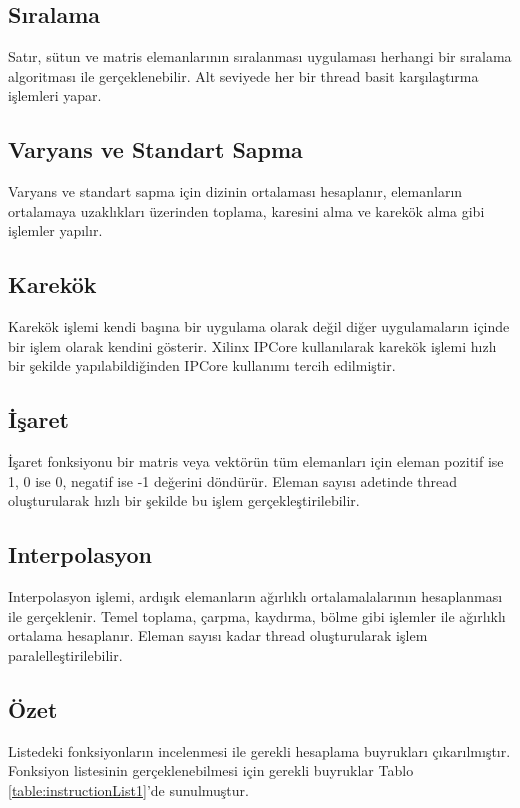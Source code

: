 \subsection{Sıralama}
Satır, sütun ve matris elemanlarının sıralanması uygulaması herhangi bir sıralama algoritması ile gerçeklenebilir. Alt seviyede her bir thread  basit karşılaştırma işlemleri yapar.

\subsection{Varyans ve Standart Sapma}
Varyans ve standart sapma için dizinin ortalaması hesaplanır, elemanların ortalamaya uzaklıkları üzerinden toplama, karesini alma ve karekök alma gibi işlemler yapılır. 

\subsection{Karekök}
Karekök işlemi kendi başına bir uygulama olarak değil diğer uygulamaların içinde bir işlem olarak kendini gösterir. Xilinx IPCore kullanılarak karekök işlemi hızlı bir şekilde yapılabildiğinden IPCore kullanımı tercih edilmiştir.

\subsection{İşaret}
İşaret fonksiyonu bir matris veya vektörün tüm elemanları için eleman pozitif ise 1, 0 ise 0, negatif ise -1 değerini döndürür. Eleman sayısı adetinde thread oluşturularak hızlı bir şekilde bu işlem gerçekleştirilebilir.

\subsection{Interpolasyon}
Interpolasyon işlemi, ardışık elemanların ağırlıklı ortalamalalarının hesaplanması ile gerçeklenir. Temel toplama, çarpma, kaydırma, bölme gibi işlemler ile ağırlıklı ortalama hesaplanır. Eleman sayısı kadar thread oluşturularak işlem paralelleştirilebilir.

\subsection{Özet}
Listedeki fonksiyonların incelenmesi ile gerekli hesaplama buyrukları çıkarılmıştır. Fonksiyon listesinin gerçeklenebilmesi için gerekli buyruklar Tablo \ref{table:instructionList1}'de sunulmuştur. 

